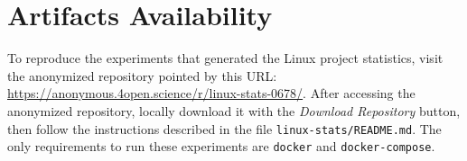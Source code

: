 \documentclass[sigconf]{acmart} %
\begin{document}
\section*{Artifacts Availability}

To reproduce the experiments that generated the Linux project statistics, visit
the anonymized repository pointed by this URL:
\url{https://anonymous.4open.science/r/linux-stats-0678/}. After accessing the
anonymized repository, locally download it with the \textit{Download Repository}
button, then follow the instructions described in the file
\texttt{linux-stats/README.md}. The only requirements to run these experiments
are \texttt{docker} and \texttt{docker-compose}.




\end{document}
